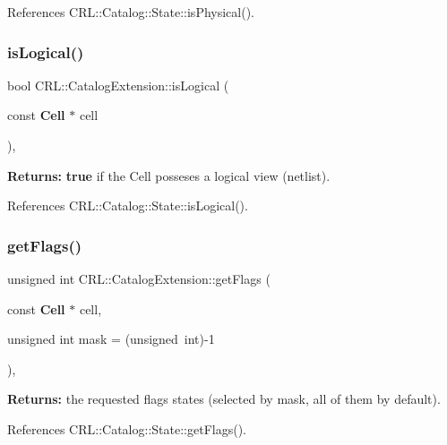 References C\+R\+L\+::\+Catalog\+::\+State\+::is\+Physical().

\mbox{\label{classCRL_1_1CatalogExtension_a558c506a28d2230e592080dccbcca380}} 
\subsubsection{\texorpdfstring{is\+Logical()}{isLogical()}}
{\footnotesize\ttfamily bool C\+R\+L\+::\+Catalog\+Extension\+::is\+Logical (\begin{DoxyParamCaption}\item[{const \textbf{ Cell} $\ast$}]{cell }\end{DoxyParamCaption})\hspace{0.3cm}{\ttfamily [inline]}, {\ttfamily [static]}}

{\bfseries Returns\+:} {\bfseries true} if the Cell posseses a logical view (netlist). 

References C\+R\+L\+::\+Catalog\+::\+State\+::is\+Logical().

\mbox{\label{classCRL_1_1CatalogExtension_a9525c2253aa310a63de32caaeb694e66}} 
\subsubsection{\texorpdfstring{get\+Flags()}{getFlags()}}
{\footnotesize\ttfamily unsigned int C\+R\+L\+::\+Catalog\+Extension\+::get\+Flags (\begin{DoxyParamCaption}\item[{const \textbf{ Cell} $\ast$}]{cell,  }\item[{unsigned int}]{mask = {\ttfamily (unsigned~int)-\/1} }\end{DoxyParamCaption})\hspace{0.3cm}{\ttfamily [inline]}, {\ttfamily [static]}}

{\bfseries Returns\+:} the requested flags states (selected by {\ttfamily mask}, all of them by default). 

References C\+R\+L\+::\+Catalog\+::\+State\+::get\+Flags().


